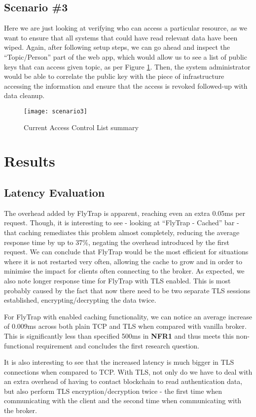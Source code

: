 \subsection{Scenario \#3}
Here we are just looking at verifying who can access a particular resource, as we want to ensure that all systems that could have read relevant data have been wiped. Again, after following setup steps, we can go ahead and inspect the ``Topic/Person'' part of the web app, which would allow us to see a list of public keys that can access given topic, as per Figure \ref{fig:scenario3}. Then, the system administrator would be able to correlate the public key with the piece of infrastructure accessing the information and ensure that the access is revoked followed-up with data cleanup.
\begin{figure}[h]
    \centering
    \texttt{[image: scenario3]}
    \caption{Current Access Control List summary}
    \label{fig:scenario3}
\end{figure}
\section{Results}
\subsection{Latency Evaluation}
The overhead added by FlyTrap is apparent, reaching even an extra 0.05ms per request. Though, it is interesting to see - looking at ``FlyTrap - Cached'' bar - that caching remediates this problem almost completely, reducing the average response time by up to 37\%, negating the overhead introduced by the first request. We can conclude that FlyTrap would be the most efficient for situations where it is not restarted very often, allowing the cache to grow and in order to minimise the impact for clients often connecting to the broker. As expected, we also note longer response time for FlyTrap with TLS enabled. This is most probably caused by the fact that now there need to be two separate TLS sessions established, encrypting/decrypting the data twice.

For FlyTrap with enabled caching functionality, we can notice an average increase of 0.009ms across both plain TCP and TLS when compared with vanilla broker. This is significantly less than specified 500ms in \textbf{NFR1} and thus meets this non-functional requirement and concludes the first research question.

It is also interesting to see that the increased latency is much bigger in TLS connections when compared to TCP. With TLS, not only do we have to deal with an extra overhead of having to contact blockchain to read authentication data, but also perform TLS encryption/decryption twice - the first time when communicating with the client and the second time when communicating with the broker.
